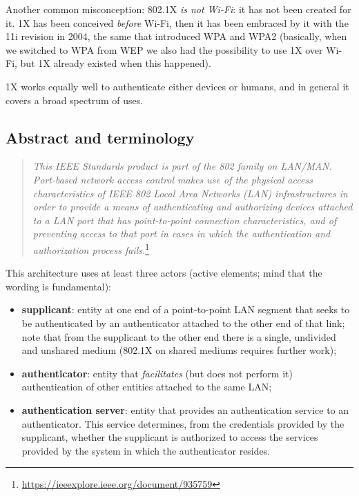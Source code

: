 Another common misconception: 802.1X \textit{is not Wi-Fi}: it has not been created for it. 1X has been conceived \textit{before} Wi-Fi, then it has been embraced by it with the 11i revision in 2004, the same that introduced WPA and WPA2 (basically, when we switched to WPA from WEP we also had the possibility to use 1X over Wi-Fi, but 1X already existed when this happened).

1X works equally well to authenticate either devices or humans, and in general it covers a broad spectrum of uses.


\subsection{Abstract and terminology}
\begin{quote}
    \centering
    \emph{This IEEE Standards product is part of the 802 family on LAN/MAN. Port-based network access control makes use of the physical access characteristics of IEEE 802 Local Area Networks (LAN) infrastructures in order to provide a means of authenticating and authorizing devices attached to a LAN port that has point-to-point connection characteristics, and of preventing access to that port in cases in which the authentication and authorization process fails.}\footnote{\url{https://ieeexplore.ieee.org/document/935759}}
\end{quote}

This architecture uses at least three actors (active elements; mind that the wording is fundamental):

\begin{itemize}
\item \textbf{supplicant}: entity at one end of a point-to-point LAN segment that seeks to be
authenticated by an authenticator attached to the other end of that link; note that from the supplicant to the other end there is a single, undivided and unshared medium (802.1X on shared mediums requires further work);
\item \textbf{authenticator}: entity that \textit{facilitates} (but does not perform it) authentication of other entities attached to the same LAN;
\item \textbf{authentication server}: entity that provides an authentication service to an authenticator.  This service determines, from the credentials provided by the supplicant, whether the supplicant is authorized to access the services provided by the system in which the authenticator resides.
\end{itemize}

